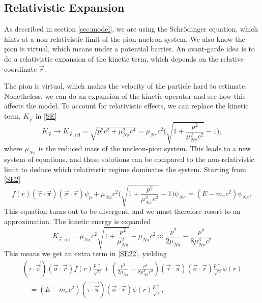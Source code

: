 \subsection{Relativistic Expansion}
As described in section \ref{sec:model}, we are using the Schrödinger equation, which hints at a non-relativistic limit of the pion-nucleon system. We also know the pion is virtual, which means under a potential barrier. An avant-garde idea is to do a relativistic expansion of the kinetic term, which depends on the relative coordinate $\vec{r}$. 


%
The pion is virtual, which makes the velocity of the particle hard to estimate. Nonetheless, we can do an expansion of the kinetic operator and see how this affects the model. To account for relativistic effects, we can replace the kinetic term, $K_{\vec{r}}$ in \eqref{SE}
\begin{equation}
	K_{\vec{r}}\rightarrow K_{\vec{r},\text{rel}} = \sqrt{p^2 c^2+\mu_{N\pi}^2 c^4} = \mu_{N\pi} c^2 \bigg(\sqrt{1+\frac{p^2}{\mu_{N\pi}^2 c^2}}-1 \bigg),
\end{equation}
where $\mu_{N\pi}$ is the reduced mass of the nucleon-pion system. This leads to a new system of equations, and these solutions can be compared to the non-relativistic limit to deduce which relativistic regime dominates the system. Starting from \eqref{SE2}
\begin{equation}
	f(r) (\vec{\tau} \cdot \vec{\pi})(\vec{\sigma}\cdot \vec{r})\psi_p + \mu_{N\pi} c^2 \bigg(\sqrt{1+\frac{p^2}{\mu_{N\pi}^2 c^2}}-1 \bigg)\psi_{N\pi} = (E-m_{\pi}c^2)\psi_{N\pi},
\end{equation}
This equation turns out to be divergent, and we must therefore resort to an approximation. The kinetic energy is expanded
\begin{equation}
	K_{\vec{r},\text{rel}} = \mu_{N\pi} c^2\sqrt{1+\frac{p^2}{\mu_{N\pi}^2}}-\mu_{N\pi} c^2 \approx \frac{p^2}{2\mu_{N\pi}}-\frac{p^4}{8\mu_{N\pi}^3 c^2}
\end{equation}
This means we get an extra term in \eqref{SE22}, yielding
\begin{equation}\begin{split}\label{SErel}
		(\vec{\tau\cdot\vec{\pi}})(\vec{\sigma}\cdot\vec{r})f(r)  \frac{p\uparrow}{\sqrt{V}}+\left(\frac{p^2}{2\mu_{N\pi}}-\frac{p^4}{8\mu_{N\pi}^3 c^2} \right)(\vec{\tau}\cdot\vec{\pi})(\vec{\sigma}\cdot\vec{r})\frac{p\uparrow}{\sqrt{V}}\phi(r) \\ \quad= (E-m_\pi c^2) (\vec{\tau\cdot\vec{\pi}})(\vec{\sigma}\cdot\vec{r}) \phi(r)\frac{p\uparrow}{\sqrt{V}},
	\end{split}
\end{equation}

